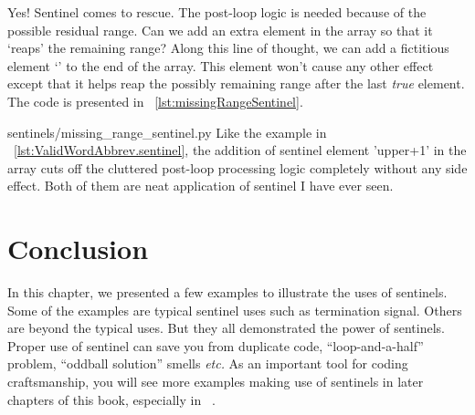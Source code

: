 Yes!
Sentinel comes to rescue.
The post-loop logic is needed because of the possible residual range.
Can we add an extra element in the array so that it `reaps' the remaining range?
Along this line of thought, we can add a fictitious element `' to the end of the
array.
This element won't cause any other effect except that it helps reap the possibly remaining range
after the last \emph{true} element.
The code is presented in ~\autoref{lst:missingRangeSentinel}.

{sentinels/missing_range_sentinel.py}
Like the example in ~\autoref{lst:ValidWordAbbrev.sentinel},
the addition of sentinel element 'upper+1' in the array cuts off the cluttered
post-loop processing logic completely without any side effect.
Both of them are neat application of sentinel I have ever seen.

\section{Conclusion}

In this chapter, we presented a few examples to illustrate the uses of sentinels.
Some of the examples are typical sentinel uses such as termination signal.
Others are beyond the typical uses.
But they all demonstrated the power of sentinels.
Proper use of sentinel can save you from duplicate code, ``loop-and-a-half'' problem,
``oddball solution'' smells \textit{etc.}
As an important tool for coding craftsmanship, you will see more examples making use of
sentinels in later chapters of this book, especially in ~.
